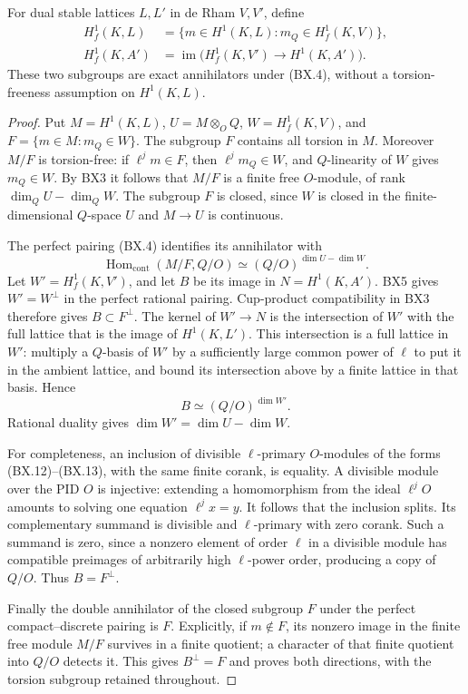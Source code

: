 \begin{proposition}
\label{claim:BX6}
For dual stable lattices $L,L'$ in de Rham $V,V'$,
define
\[
 \begin{split}
 H_f^1(K,L)&=\{m\in H^1(K,L):m_Q\in H_f^1(K,V)\},\\
 H_f^1(K,A')&=\operatorname{im}\bigl(
                H_f^1(K,V')\longrightarrow H^1(K,A')\bigr).
 \end{split}                                                   \tag{BX.11}
\]
These two subgroups are exact annihilators under (BX.4),
without a torsion-freeness assumption on $H^1(K,L)$.
\end{proposition}
\begin{proof}
Put $M=H^1(K,L)$, $U=M\otimes_OQ$, $W=H_f^1(K,V)$,
and $F=\{m\in M:m_Q\in W\}$.
The subgroup $F$ contains all torsion in $M$.  Moreover
$M/F$ is torsion-free: if $\ell^jm\in F$, then
$\ell^jm_Q\in W$, and $Q$-linearity of $W$ gives $m_Q\in W$.
By BX3 it follows that $M/F$ is a finite free $O$-module,
of rank $\dim_QU-\dim_QW$.
The subgroup $F$ is closed, since $W$ is closed in the
finite-dimensional $Q$-space $U$ and $M\to U$ is continuous.

The perfect pairing (BX.4) identifies its annihilator with
\[
       \operatorname{Hom}_{\mathrm{cont}}(M/F,Q/O)
            \simeq (Q/O)^{\dim U-\dim W}.                     \tag{BX.12}
\]
Let $W'=H_f^1(K,V')$, and let $B$ be its image in
$N=H^1(K,A')$.  BX5 gives $W'=W^\perp$ in the perfect
rational pairing.  Cup-product compatibility in BX3
therefore gives $B\subset F^\perp$.
The kernel of $W'\to N$ is the intersection of $W'$ with
the full lattice that is the image of $H^1(K,L')$.
This intersection is a full lattice in $W'$: multiply a
$Q$-basis of $W'$ by a sufficiently large common power of
$\ell$ to put it in the ambient lattice, and bound its
intersection above by a finite lattice in that basis.
Hence
\[
                     B\simeq (Q/O)^{\dim W'}.
                                                               \tag{BX.13}
\]
Rational duality gives
$\dim W'=\dim U-\dim W$.

For completeness, an inclusion of divisible $\ell$-primary
$O$-modules of the forms (BX.12)--(BX.13), with the same
finite corank, is equality.  A divisible module over the
PID $O$ is injective: extending a homomorphism from the
ideal $\ell^jO$ amounts to solving one equation
$\ell^jx=y$.  It follows that the inclusion splits.
Its complementary summand is divisible and $\ell$-primary
with zero corank.  Such a summand is zero, since a nonzero
element of order $\ell$ in a divisible module has
compatible preimages of arbitrarily high $\ell$-power
order, producing a copy of $Q/O$.  Thus $B=F^\perp$.

Finally the double annihilator of the closed subgroup $F$
under the perfect compact--discrete pairing is $F$.
Explicitly, if $m\notin F$, its nonzero image in the finite
free module $M/F$ survives in a finite quotient; a character
of that finite quotient into $Q/O$ detects it.
This gives $B^\perp=F$ and proves both directions, with the
torsion subgroup retained throughout.
\end{proof}

